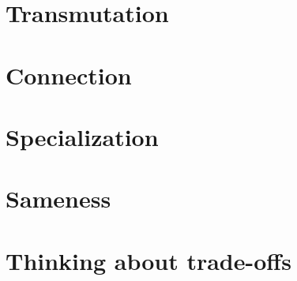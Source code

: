 \documentclass[paper=6in:9in,pagesize=pdftex,
 headinclude=off,footinclude=on,11pt,twoside]{scrbook}
\begin{document}

\setcounter{tocdepth}{1}
\tableofcontents

%

\chapter{Transmutation}

\clearpage

\chapter{Connection}

\clearpage

\chapter{Specialization}

\clearpage
%
\chapter{Sameness}

\clearpage
%
%
%
%
%
%
\chapter{Thinking about trade-offs}

\clearpage
%
\end{document}
